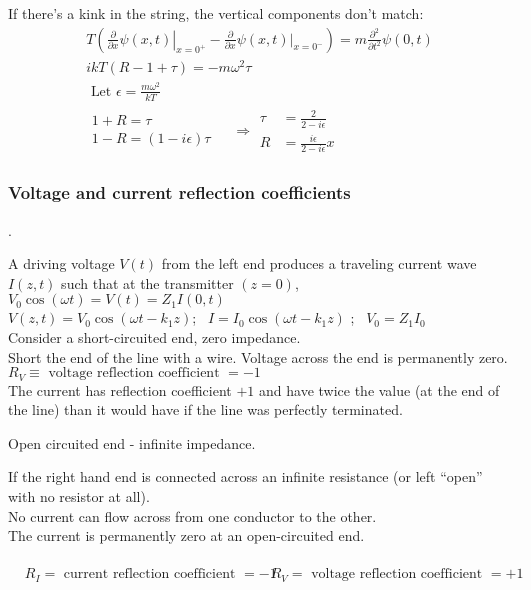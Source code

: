 \documentclass[twoside, 10pt]{amsart}
\begin{document}
If there's a kink in the string, the vertical components don't match:
\[
\begin{gathered}
  T \left( \left. \frac{ \partial}{ \partial x} \psi(x,t)  \right|_{x = 0^+} - \frac{ \partial}{ \partial x } \left. \psi(x,t) \right|_{x=0^-} \right) = m \frac{ \partial^2 }{ \partial t^2 } \psi(0,t) \\
  ik T(R- 1 + \tau) = - m \omega^2 \tau \\
  \text{ Let } \epsilon = \frac{ m \omega^2}{kT } \\
  \begin{gathered}
    1+R = \tau \\
    1-R = (1-i \epsilon)\tau 
  \end{gathered} \quad \, \Longrightarrow 
  \begin{aligned}
    \tau & = \frac{2}{ 2 - i \epsilon } \\
    R & = \frac{ i \epsilon }{ 2 - i \epsilon } x
  \end{aligned}
\end{gathered}
\]

\subsubsection{ Voltage and current reflection coefficients}.  

A driving voltage $V(t)$ from the left end produces a traveling current wave $I(z,t)$ such that at the transmitter $(z=0)$, $V_0 \cos{ (\omega t) } = V(t) = Z_1 I(0,t)$ \\
$V(z,t) = V_0 \cos{ (\omega t -k_1 z) }$; \quad \, $I = I_0 \cos{ (\omega t - k_1 z) }$ ; \quad \, $V_ 0 =Z_1 I_0$ \medskip \\
Consider a short-circuited end, zero impedance.  \\
Short the end of the line with a wire.  Voltage across the end is permanently zero.  \\
$R_V \equiv \text{ voltage reflection coefficient } = -1$ \smallskip \\
The current has reflection coefficient $+1$ and have twice the value (at the end of the line) than it would have if the line was perfectly terminated.  

Open circuited end - infinite impedance. 

If the right hand end is connected across an infinite resistance (or left ``open'' with no resistor at all).  \\
No current can flow across from one conductor to the other.  \\
The current is permanently zero at an open-circuited end. \\
\quad \quad \, $\begin{aligned}
  & R_I = \text{ current reflection coefficient } = -1 
  & R_V = \text{ voltage reflection coefficient } = + 1 
\end{aligned}$
\end{document}
